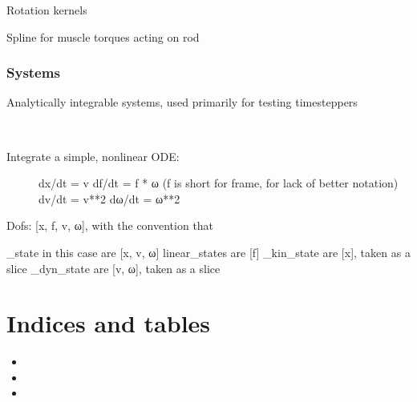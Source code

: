 \documentclass[letterpaper,10pt,english]{sphinxmanual}
\begin{document}
\label{\detokenize{documentation:module-elastica._rotations}}
Rotation kernels

\label{\detokenize{documentation:module-elastica._spline}}
Spline for muscle torques acting on rod


\subsection{Systems}
\label{\detokenize{documentation:module-elastica.systems.analytical}}\label{\detokenize{documentation:systems}}
Analytically integrable systems, used primarily for testing time\sphinxhyphen{}steppers

\begin{fulllineitems}
\label{\detokenize{documentation:elastica.systems.analytical.SecondOrderHybridSystem}}~\begin{description}
\item[{Integrate a simple, non\sphinxhyphen{}linear ODE:}] \leavevmode
dx/dt = v
df/dt = \sphinxhyphen{}f * ω (f is short for frame, for lack of better notation)
dv/dt = \sphinxhyphen{}v**2
dω/dt = \sphinxhyphen{}ω**2

\end{description}

Dofs: {[}x, f, v, ω{]}, with the convention that

\_state in this case are {[}x, v, ω{]}
linear\_states are {[}f{]}
\_kin\_state are {[}x{]}, taken as a slice
\_dyn\_state are {[}v, ω{]}, taken as a slice

\end{fulllineitems}



\chapter{Indices and tables}
\label{\detokenize{index:indices-and-tables}}\begin{itemize}
\item {} 

\item {} 

\item {} 

\end{itemize}
\end{document}

